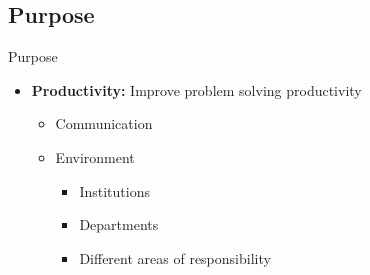 \subsection{Purpose}
\begin{frame}{Purpose}

\begin{itemize}
	\item \textbf{Productivity:} Improve problem solving productivity
	\begin{itemize}
		\item Communication
		\item Environment
		\begin{itemize}
			\item Institutions
			\item Departments
			\item Different areas of responsibility
			\end{itemize}
	\end{itemize}
\end{itemize}


\end{frame}
